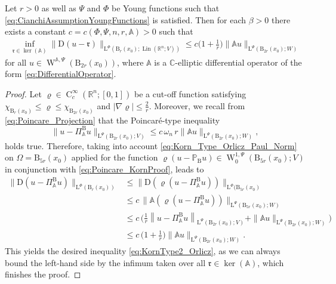 \documentclass[10pt,a4paper]{amsart}
\DeclareMathOperator{\Lin}{Lin}
\newcommand{\Aop}{\mathbb{A}}
\newcommand{\C}{\mathbb C}
\newcommand{\D}{\mathrm{D}}
\newcommand{\Proj}{\mathbb{P}}
\newcommand{\R}{\mathbb R}
\newcommand{\abs}[1]{\left\lvert#1\right\rvert}
\newcommand{\ball}{\mathrm{B}}
\newcommand{\hold}{\operatorname{C}}
\newcommand{\rfrak}{\mathfrak{r}}
\newcommand{\sobo}{\operatorname{W}}
\renewcommand{\L}{\mathrm{L}}
\begin{document}
\begin{thm}
	Let $r>0$ as well as $\Psi$ and $\Phi$ be Young functions such that \eqref{eq:CianchiAssumptionYoungFunctions} is satisfied. Then for each $\beta>0$ there exists a constant $c=c(\Phi,\Psi,n,r,\Aop)>0$ such that 
	\begin{align}\label{eq:KornType2_Orlicz}
		\inf_{\rfrak\in\ker(\Aop)} \|\D (u-\rfrak)\|_{\L^\Phi(\ball_r(x_0);\Lin(\R^n;V))}\leq c \bigg(1+\frac{1}{r}\bigg)\|\Aop u \|_{\L^\Psi(\ball_{2r}(x_0);W)}
	\end{align}
	for all $u\in\sobo^{\Aop,\Psi}(\ball_{2r}(x_0))$, where $\Aop$ is a  $\C$-elliptic differential operator of the form \eqref{eq:DifferentialOperator}.
\end{thm}

\begin{proof}
	Let $\varrho\in\hold^\infty_c(\R^n;[0,1])$ be a cut-off function satisfying $\chi_{\ball_{r}(x_0)}\leq \varrho\leq \chi_{\ball_{2r}(x_0)}$ and $\abs{\nabla\varrho}\leq\frac{2}{r}$. Moreover, we recall from \eqref{eq:Poincare_Projection} that the  Poincar\'e-type inequality 
	\begin{equation}\label{eq:Poincare_KornProof}
		\|u-\Pi_\Aop^\ball u\|_{\L^\Psi(\ball_{2r}(x_0);V)} \leq c\,\omega_n\, r\|\Aop u\|_{\L^\Psi(\ball_{2r}(x_0);W)},
	\end{equation}
	holds true. Therefore, taking into account \eqref{eq:Korn_Type_Orlicz_Paul_Norm} on $\Omega=\ball_{5r}(x_0)$ applied for the function $\varrho(u-\Proj_\ball u)\in\sobo^{1,\Psi}_0(\ball_{5r}(x_0);V)$ in conjunction with \eqref{eq:Poincare_KornProof}, leads to 
	\begin{align*}
		\|\D (u-\Pi_\Aop^\ball u)\|_{\L^\Phi(\ball_{r}(x_0))} 
		&\leq \|\D (\varrho(u-\Pi_\Aop^\ball u))\|_{\L^\Phi(\ball_{5r}(x_0)}\\
		& \leq c \,\|\Aop (\varrho(u-\Pi_\Aop^\ball u))\|_{\L^\Psi(\ball_{5r}(x_0);W)}\\
		&\leq c \,\bigg( \frac1r\left\|u-\Pi_\Aop^\ball u\right\|_{\L^\Psi(\ball_{2r}(x_0);V)} +  \|\Aop u\|_{\L^\Psi(\ball_{2r}(x_0); W)}\bigg)\\
		&\leq c\,\bigg(1+\frac{1}{r}\bigg) \|\Aop u\|_{\L^\Psi(\ball_{2r}(x_0);W)}.
	\end{align*}
	This yields the desired inequality \eqref{eq:KornType2_Orlicz}, as we can always bound the left-hand side by the infimum taken over all $\rfrak\in\ker(\Aop)$, which finishes the proof. 
\end{proof}
\end{document}
